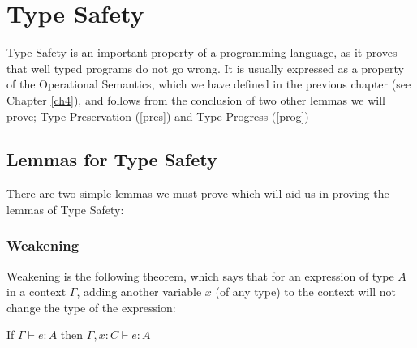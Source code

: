\chapter{Type Safety}\label{safe}
Type Safety is an important property of a programming language, as it proves that well typed programs do not go wrong. It is usually expressed as a property of the Operational Semantics, which we have defined in the previous chapter (see Chapter \ref{ch4}), and follows from the conclusion of two other lemmas we will prove; Type Preservation (\ref{pres}) and Type Progress (\ref{prog})

\section{Lemmas for Type Safety}
There are two simple lemmas we must prove which will aid us in proving the lemmas of Type Safety:


\subsection{Weakening}\label{weak} 
Weakening is the following theorem, which says that for an expression of type $A$ in a context $\Gamma$, adding another variable $x$ (of any type) to the context will not change the type of the expression:

\vspace{0.5cm}

\begin{thm}
If $\Gamma \vdash e:A$ then  $\Gamma,x:C \vdash e:A$ 
\end{thm}
 
